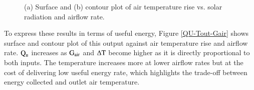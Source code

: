 \begin{figure}[ht!]
\begin{minipage}{0.49\columnwidth}
	\end{minipage}
	\caption{(a) Surface and (b) contour plot of air temperature rise vs. solar radiation and airflow rate.}
	\label{Tout-IT-Gair}
\end{figure}


To express these results in terms of useful energy, Figure \ref{QU-Tout-Gair} shows surface and contour plot of this output against air temperature rise and airflow rate. $\rm{Q_u}$ increases as $\rm{G_{air}}$ and $\Delta \rm{T}$ become higher as it is directly proportional to both inputs. The temperature increases more at lower airflow rates but at the cost of delivering low useful energy rate, which highlights the trade-off between energy collected and outlet air temperature.

